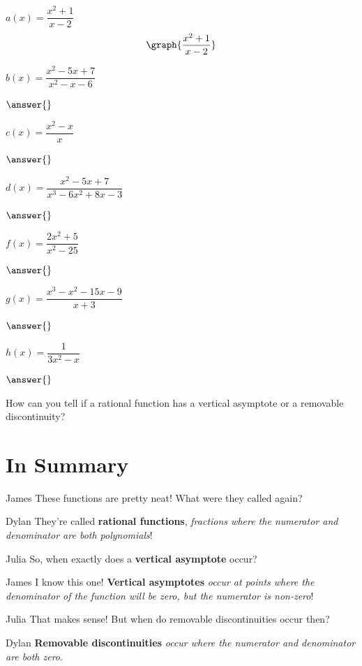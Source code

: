 \documentclass{ximera}
\begin{document}
\begin{question}
$a(x) = \dfrac{x^2+1}{x-2}$
\[
\graph{\frac{x^2+1}{x-2}}
\]
\begin{selectAll}
\end{selectAll}

$b(x) = \dfrac{x^2-5x+7}{x^2-x-6}$

$\answer{}$

$c(x) = \dfrac{x^2-x}{x}$

$\answer{}$

$d(x) = \dfrac{x^2-5x+7}{x^3-6x^2+8x-3}$

$\answer{}$

$f(x) = \dfrac{2x^2+5}{x^2-25}$

$\answer{}$

$g(x) = \dfrac{x^3-x^2-15x-9}{x+3}$

$\answer{}$

$h(x) = \dfrac{1}{3x^2-x}$

$\answer{}$
\end{question}
\begin{question}
How can you tell if a rational function has a vertical asymptote or a removable discontinuity?
\begin{multipleChoice}
\end{multipleChoice}
\end{question}

\section{In Summary}
\begin{dialogue}
\item[James] These functions are pretty neat! What were they called again?
\item[Dylan] They're called \textbf{rational functions}, \textit{fractions where the numerator and denominator are both polynomials}!
\item[Julia] So, when exactly does a \textbf{vertical asymptote} occur?
\item[James] I know this one! \textbf{Vertical asymptotes} \textit{occur at points where the denominator of the function will be zero, but the numerator is non-zero}!
\item[Julia] That makes sense! But when do removable discontinuities occur then?
\item[Dylan] \textbf{Removable discontinuities} \textit{occur where the numerator and denominator are both zero}.
\end{dialogue}
\end{document}
